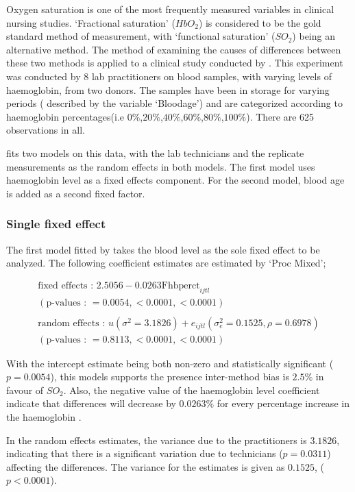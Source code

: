 \documentclass[12pt, a4paper]{report}
\theoremstyle{plain}
\theoremstyle{definition}
\theoremstyle{remark}
\begin{document}
Oxygen saturation is one of the most frequently measured variables
in clinical nursing studies. `Fractional saturation' ($HbO_{2}$)
is considered to be the gold standard method of measurement, with
`functional saturation' ($SO_{2}$) being an alternative method.
The method of examining the causes of differences between these
two methods is applied to a clinical study conducted by
\citet{Shiao}. This experiment was conducted by 8 lab
practitioners on blood samples, with varying levels of
haemoglobin, from two donors. The samples have been in storage for
varying periods ( described by the variable `Bloodage') and are
categorized according to haemoglobin percentages(i.e
$0\%$,$20\%$,$40\%$,$60\%$,$80\%$,$100\%$). There are 625
observations in all.

\citet{LaiShiao} fits two models on this data, with the lab
technicians and the replicate measurements as the random effects
in both models. The first model uses haemoglobin level as a fixed
effects component. For the second model, blood age is added as a
second fixed factor.

\subsubsection{Single fixed effect} The first model fitted by \citet{LaiShiao} takes the
blood level as the sole fixed effect to be analyzed. The following
coefficient estimates are estimated by `Proc Mixed';
\begin{framed}\begin{eqnarray}
	\mbox{fixed effects :   } 2.5056 - 0.0263\mbox{Fhbperct}_{ijtl} \\
	(\mbox{p-values :   } = 0.0054, <0.0001, <0.0001)\nonumber\\\nonumber\\
	\mbox{random effects :   } u(\sigma^{2}=3.1826) + e_{ijtl}
	(\sigma^{2}_{e}=0.1525, \rho= 0.6978) \nonumber\\
	(\mbox{p-values :   } = 0.8113, <0.0001, <0.0001)\nonumber
	\end{eqnarray}
\end{framed}
With the intercept estimate being both non-zero and statistically
significant ($p=0.0054$), this models supports the presence
inter-method bias is $2.5\%$ in favour of $SO_{2}$. Also, the
negative value of the haemoglobin level coefficient indicate that
differences will decrease by $0.0263\%$ for every percentage
increase in the haemoglobin .

In the random effects estimates, the variance due to the
practitioners is $3.1826$, indicating that there is a significant
variation due to technicians ($p=0.0311$) affecting the
differences. The variance for the estimates is given as $0.1525$,
($p<0.0001$).
\end{document}
